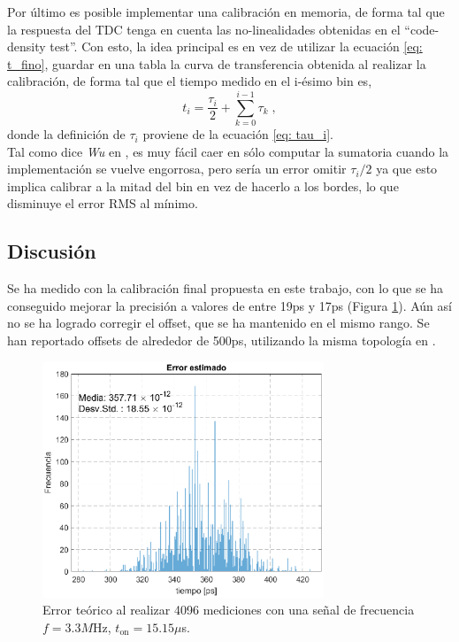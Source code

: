 Por último es posible implementar una calibración en memoria, de forma tal que la respuesta del TDC
tenga en cuenta las no-linealidades obtenidas en el ``code-density test''. Con esto, la idea principal es
en vez de utilizar la ecuación \ref{eq: t_fino}, guardar en una tabla la curva de transferencia obtenida
al realizar la calibración, de forma tal que el tiempo medido en el i-ésimo bin es,
\begin{equation*}
     t_i = \dfrac{\tau_i}{2} + \sum_{k=0}^{i-1} \tau_k \; ,
\end{equation*}
donde la definición de $\tau_i$ proviene de la ecuación \ref{eq: tau_i}. \\
Tal como dice \textit{Wu} en \cite{Wu2010}, es muy fácil caer en sólo computar la sumatoria cuando
la implementación se vuelve engorrosa, pero sería un error omitir $\tau_i/2$ ya que esto implica calibrar
a la mitad del bin en vez de hacerlo a los bordes, lo que disminuye el error RMS al mínimo.

\subsection{Discusión}
Se ha medido con la calibración final propuesta en este trabajo, con lo que se ha conseguido mejorar
la precisión a valores de entre 19ps y 17ps (Figura \ref{fig: medicion_final}). Aún así no se ha logrado corregir el offset, que se ha mantenido
en el mismo rango. Se han reportado offsets de alrededor de 500ps, utilizando la misma topología
en \cite{machado_readout_2020}. \\

\begin{figure}[H]
      \centering
      \includegraphics[width=0.75\textwidth]{imagenes/Medicion_final.eps}
      \caption{Error teórico al realizar 4096 mediciones con una señal de frecuencia $f=3.3M$Hz, $t_\text{on} = 15.15\mu$s.}
      \label{fig: medicion_final}
\end{figure}

